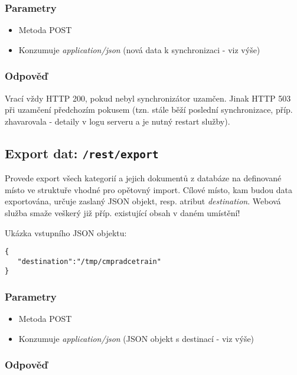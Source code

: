 \documentclass{article}
\begin{document}
\subsubsection{Parametry}

\begin{itemize}
	\item Metoda POST
	\item Konzumuje \textit{application/json} (nová data k synchronizaci - viz výše)
\end{itemize}

\subsubsection{Odpověď}

Vrací vždy HTTP 200, pokud nebyl synchronizátor uzamčen. Jinak HTTP 503 při uzamčení předchozím pokusem (tzn. stále běží poslední synchronizace, příp. zhavarovala - detaily v logu serveru a je nutný restart služby).

\subsection{Export dat: \texttt{/rest/export}}
\label{subsec:export}

Provede export všech kategorií a jejich dokumentů z databáze na definované místo ve struktuře vhodné pro opětovný import. Cílové místo, kam budou data exportována, určuje zaslaný JSON objekt, resp. atribut \textit{destination}. Webová služba smaže veškerý již příp. existující obsah v daném umístění! 

Ukázka vstupního JSON objektu:

\begin{verbatim}
{
   "destination":"/tmp/cmpradcetrain"
}
\end{verbatim}

\subsubsection{Parametry}

\begin{itemize}
	\item Metoda POST
	\item Konzumuje \textit{application/json} (JSON objekt s destinací - viz výše)
\end{itemize}

\subsubsection{Odpověď}
\end{document}
